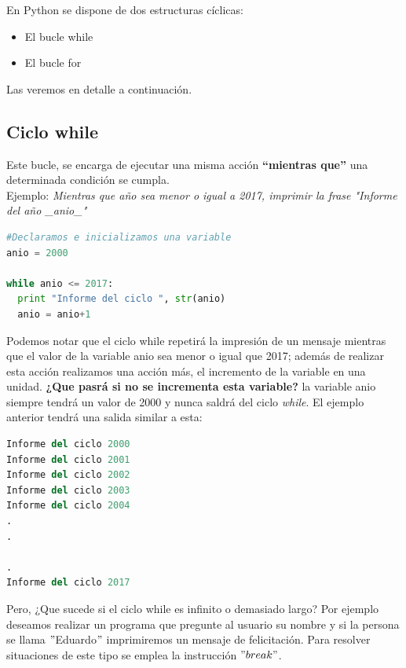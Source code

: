 \documentclass[a4paper, openright, 12pt]{article}
\begin{document}
    En Python se dispone de dos estructuras cíclicas:

    \begin{itemize}
      \item{El bucle while}
      \item{El bucle for}
    \end{itemize}

    Las veremos en detalle a continuación.\\

    \subsection{Ciclo while}
      Este bucle, se encarga de ejecutar una misma acción \textbf{“mientras que”} una determinada condición se cumpla.\\

      Ejemplo: \textit{Mientras que año sea menor o igual a 2017, imprimir la frase "Informe del año \_anio\_"}\\

\begin{lstlisting}[language=Python]
#Declaramos e inicializamos una variable
anio = 2000

while anio <= 2017:
  print "Informe del ciclo ", str(anio)
  anio = anio+1         
\end{lstlisting}

    Podemos notar que el ciclo while repetirá la impresión de un mensaje mientras que el valor de la variable anio sea menor o igual que 2017; además de realizar esta acción realizamos una acción más, el incremento de la variable en una unidad. \textbf{¿Que pasrá si no se incrementa esta variable?} la variable anio siempre tendrá un valor de 2000 y nunca saldrá del ciclo \textit{while}. El ejemplo anterior tendrá una salida similar a esta:\\

\begin{lstlisting}[language=Python]
Informe del ciclo 2000
Informe del ciclo 2001
Informe del ciclo 2002        
Informe del ciclo 2003
Informe del ciclo 2004
.
.

.
Informe del ciclo 2017
\end{lstlisting}    

    Pero, ¿Que sucede si el ciclo while es infinito o demasiado largo? Por ejemplo deseamos realizar un programa que pregunte al usuario su nombre y si la persona se llama $"$Eduardo$"$ imprimiremos un mensaje de felicitación. Para resolver situaciones de este tipo se emplea la instrucción $"break"$.\\
\end{document}

